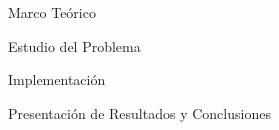 \documentclass[a4paper,12pt]{report}
\begin{document}
\maketitle{}

\newpage
\tableofcontents{}

\newpage
\listoffigures{}

\newpage
\listoftables{}


\newpage
\begin{part}{Marco Teórico}
\newpage
\newpage
\end{part}
\begin{part}{Estudio del Problema}
\newpage
\newpage
\newpage

\newpage
\newpage
%
\end{part}
\begin{part}{Implementación}
\newpage
\newpage
\end{part}

\begin{part}{Presentación de Resultados y Conclusiones}
\newpage

\newpage
%
\end{part}
\end{document}
